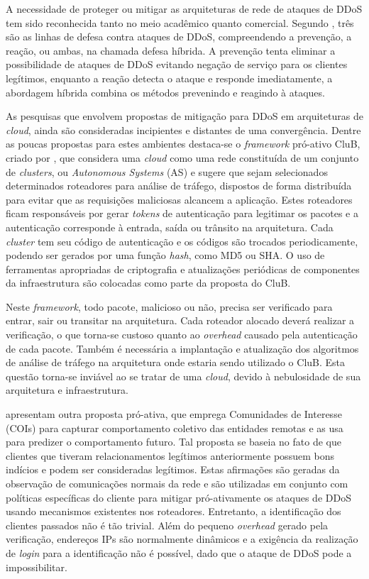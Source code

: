 
A necessidade de proteger ou mitigar as arquiteturas de rede de ataques de DDoS tem sido reconhecida tanto no meio acadêmico quanto comercial. Segundo \cite{1039856}, três são as linhas de defesa contra ataques de DDoS, compreendendo a prevenção, a reação, ou ambas, na chamada defesa híbrida. A prevenção tenta eliminar a possibilidade de ataques de DDoS evitando negação de serviço para os clientes legítimos, enquanto a reação detecta o ataque e responde imediatamente, a abordagem híbrida combina os métodos prevenindo e reagindo à ataques.

As pesquisas que envolvem propostas de mitigação para DDoS em arquiteturas de \emph{cloud}, ainda são consideradas incipientes e distantes de uma convergência. Dentre as poucas propostas para estes ambientes destaca-se o \emph{framework} pró-ativo CluB, criado por \cite{Hazelhurst:2008:SCU:1456659.1456671}, que considera uma \emph{cloud} como uma rede constituída de um conjunto de \emph{clusters}, ou \emph{Autonomous Systems} (AS) e sugere
que sejam selecionados determinados roteadores para análise de tráfego, dispostos de forma distribuída para evitar que as requisições maliciosas alcancem a aplicação. Estes roteadores ficam responsáveis por gerar \emph{tokens} de autenticação para legitimar os pacotes e a autenticação corresponde à entrada, saída ou trânsito na arquitetura. Cada \emph{cluster} tem seu código de autenticação e os códigos são trocados periodicamente, podendo ser gerados por uma função \emph{hash}, como MD5 ou SHA. O uso de ferramentas apropriadas de criptografia e atualizações periódicas de componentes da infraestrutura são colocadas como parte da proposta do CluB.



Neste \emph{framework}, todo pacote, malicioso ou não, precisa ser verificado para entrar, sair ou transitar na arquitetura. Cada roteador alocado  deverá realizar a verificação, o que torna-se custoso quanto ao \emph{overhead} causado pela autenticação de cada pacote. Também é necessária a implantação e atualização dos algoritmos de análise de tráfego na arquitetura onde estaria sendo utilizado o CluB. Esta questão torna-se inviável ao se tratar de uma \emph{cloud}, devido à nebulosidade de sua arquitetura e infraestrutura.

\cite{Verkaik:2006:PCD:1162666.1162673} apresentam outra proposta pró-ativa, que emprega Comunidades de Interesse (COIs) para capturar comportamento coletivo das entidades remotas e as usa para predizer o comportamento futuro. Tal proposta se baseia no fato de que clientes que tiveram relacionamentos legítimos anteriormente possuem bons indícios e podem ser consideradas legítimos. Estas afirmações são geradas da observação de comunicações normais da rede e são utilizadas em conjunto com políticas específicas do cliente para mitigar pró-ativamente os ataques de DDoS usando mecanismos existentes nos roteadores. 
%
Entretanto, a identificação dos clientes passados não é tão trivial. Além do pequeno \emph{overhead} gerado pela verificação, endereços IPs são normalmente dinâmicos e a exigência da realização de \emph{login} para a identificação não é possível, dado que o ataque de DDoS pode a impossibilitar.


